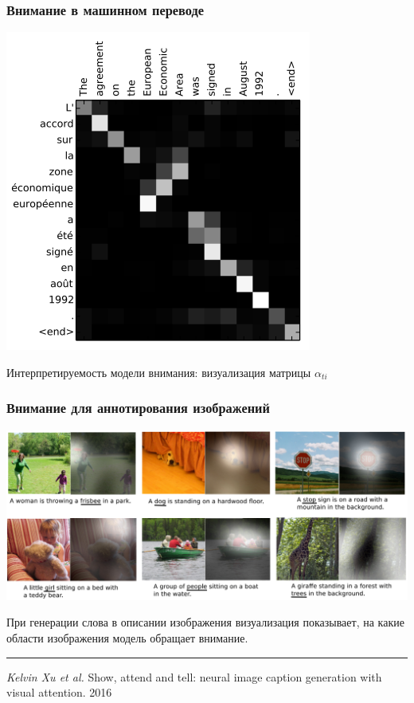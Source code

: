 \documentclass[fullscreen=true, bookmarks=true, hyperref={pdfencoding=unicode}]{beamer}
\begin{document}
\begin{frame}
  \frametitle{Внимание в машинном переводе}

  \begin{center}
    \includegraphics[keepaspectratio,
                   width=.5\paperwidth]{eng_to_french.png}

  {\small Интерпретируемость модели внимания: визуализация матрицы} $\alpha_{ti}$
  \end{center}
\end{frame}

\begin{frame}
  \frametitle{Внимание для аннотирования изображений}

  \begin{center}
    \includegraphics[keepaspectratio,
                   width=.8\paperwidth]{image_attention.png}
  \end{center}

  При генерации слова в описании изображения визуализация показывает, на какие области изображения модель обращает внимание.

  \noindent\rule{8cm}{0.4pt}

  {\small
  {\it Kelvin Xu et al.} Show, attend and tell: neural image caption generation with visual
  attention. 2016}
\end{frame}
\end{document}
